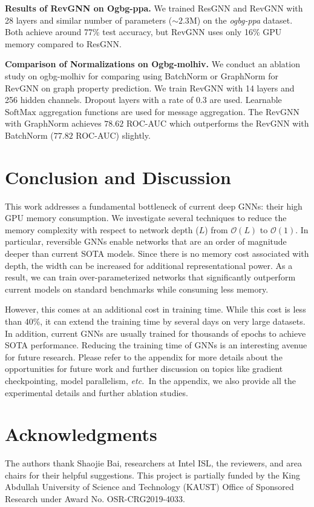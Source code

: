 \documentclass{article}
\newcommand{\etc}{\emph{etc.\xspace}}
\newcommand{\mysection}[1]{\vspace{0pt}\noindent\textbf{#1.}}
\begin{document}
\mysection{Results of RevGNN on Ogbg-ppa} 
We trained ResGNN and RevGNN with 28 layers and similar number of parameters ($\sim2.3$M) on the \emph{ogbg-ppa} dataset. Both achieve around 77\% test accuracy, but RevGNN uses only 16\% GPU memory compared to ResGNN.

\mysection{Comparison of Normalizations on Ogbg-molhiv}
We conduct an ablation study on ogbg-molhiv for comparing using BatchNorm \citep{ioffe2015batch} or GraphNorm \citep{cai2020graphnorm} for RevGNN on graph property prediction. We train RevGNN with 14 layers and 256 hidden channels. Dropout layers with a rate of $0.3$ are used. Learnable $\text{SoftMax}$ aggregation functions \citep{li2020deepergcn} are used for message aggregation. The RevGNN with GraphNorm achieves $78.62$ ROC-AUC which outperforms the RevGNN with BatchNorm ($77.82$ ROC-AUC) slightly.

\section{Conclusion and Discussion}
This work addresses a fundamental bottleneck of current deep GNNs: their high GPU memory consumption. We investigate several techniques to reduce the memory complexity with respect to network depth ($L$) from $\mathcal{O}(L)$ to $\mathcal{O}(1)$. In particular, reversible GNNs enable networks that are an order of magnitude deeper than current SOTA models. Since there is no memory cost associated with depth, the width can be increased for additional representational power. As a result, we can train over-parameterized networks that significantly outperform current models  on standard benchmarks while consuming less memory.

However, this comes at an additional cost in training time. While this cost is less than 40\%, it can extend the training time by several days on very large datasets. In addition, current GNNs are usually trained for thousands of epochs to achieve SOTA performance. Reducing the training time of GNNs is an interesting avenue for future research. Please refer to the appendix for more details about the opportunities for future work and further discussion on topics like gradient checkpointing, model parallelism, \etc~In the appendix, we also provide all the experimental details and further ablation studies.

\section*{Acknowledgments}
The authors thank Shaojie Bai, researchers at Intel ISL, the reviewers, and area chairs for their helpful suggestions. This project is partially funded by the King Abdullah University of Science and Technology (KAUST) Office of Sponsored Research under Award No. OSR-CRG2019-4033. 
\end{document}
